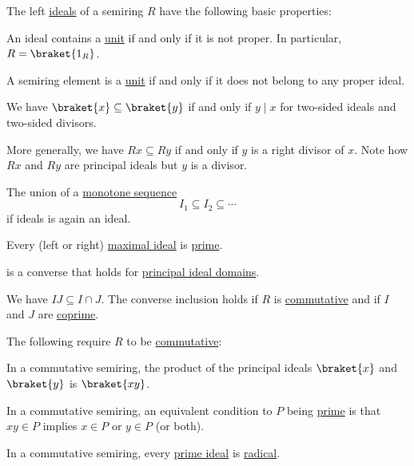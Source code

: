 \begin{proposition}\label{thm:def:semiring_ideal}
  The left \hyperref[def:semiring_ideal]{ideals} of a semiring \( R \) have the following basic properties:
  \begin{thmenum}[series=thm:def:semiring_ideal/properties]
     An ideal contains a \hyperref[def:divisibility/unit]{unit} if and only if it is not proper. In particular, \( R = \braket{ 1_R } \).

     A semiring element is a \hyperref[def:divisibility/unit]{unit} if and only if it does not belong to any proper ideal.

     We have \( \braket{ x } \subseteq \braket{ y } \) if and only if \( y \mid x \) for two-sided ideals and two-sided divisors.

    More generally, we have \( Rx \subseteq Ry \) if and only if \( y \) is a right divisor of \( x \). Note how \( Rx \) and \( Ry \) are  principal ideals but \( y \) is a  divisor.

     The union of a \hyperref[eq:def:partially_ordered_set/homomorphism/sequence]{monotone sequence}
    \begin{equation*}
      I_1 \subseteq I_2 \subseteq \cdots
    \end{equation*}
    if ideals is again an ideal.

     Every (left or right) \hyperref[def:semiring_ideal/maximal]{maximal ideal} is \hyperref[def:semiring_ideal/prime]{prime}.

     is a converse that holds for \hyperref[def:principal_ideal_domain]{principal ideal domains}.

     We have \( IJ \subseteq I \cap J \). The converse inclusion holds if \( R \) is \hyperref[def:semiring/commutative]{commutative} and if \( I \) and \( J \) are \hyperref[def:semiring_ideal/coprime]{coprime}.
  \end{thmenum}

  The following require \( R \) to be \hyperref[def:semiring/commutative]{commutative}:
  \begin{thmenum}[resume=thm:def:semiring_ideal/properties]
     In a commutative semiring, the product of the principal ideals \( \braket{x} \) and \( \braket{y} \) is \( \braket{xy} \).

     In a commutative semiring, an equivalent condition to \( P \) being \hyperref[def:semiring_ideal/prime]{prime} is that \( xy \in P \) implies \( x \in P \) or \( y \in P \) (or both).

     In a commutative semiring, every \hyperref[def:semiring_ideal/prime]{prime ideal} is \hyperref[def:radical_ideal]{radical}.
  \end{thmenum}
\end{proposition}
